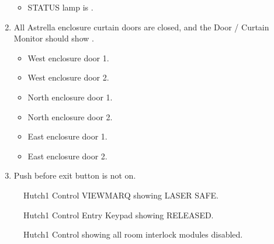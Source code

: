 \documentclass[letterpaper,10pt,english]{sphinxmanual}
\begin{document}
\begin{enumerate}
\begin{itemize}
\item {} 
\sphinxAtStartPar
STATUS lamp is .

\end{itemize}

\item {} 
\sphinxAtStartPar
All Astrella enclosure curtain doors are closed, and the Door / Curtain Monitor should show .
\begin{itemize}
\item {} 
\sphinxAtStartPar
West enclosure door 1.

\item {} 
\sphinxAtStartPar
West enclosure door 2.

\item {} 
\sphinxAtStartPar
North enclosure door 1.

\item {} 
\sphinxAtStartPar
North enclosure door 2.

\item {} 
\sphinxAtStartPar
East enclosure door 1.

\item {} 
\sphinxAtStartPar
East enclosure door 2.

\end{itemize}

\item {} 
\sphinxAtStartPar
Push before exit button is not on.

\end{enumerate}

\begin{figure}[htbp]
\centering
\capstart

\noindent{}
\caption{ Hutch\sphinxhyphen{}1 Control VIEWMARQ showing LASER SAFE.}\label{\detokenize{testing_documentation/Hutch-1_laser:id1}}\end{figure}

\begin{figure}[htbp]
\centering
\capstart

\noindent{}
\caption{ Hutch\sphinxhyphen{}1 Control Entry Keypad showing RELEASED.}\label{\detokenize{testing_documentation/Hutch-1_laser:id2}}\end{figure}

\begin{figure}[htbp]
\centering
\capstart

\noindent{}
\caption{ Hutch\sphinxhyphen{}1 Control showing all room interlock modules disabled.}\label{\detokenize{testing_documentation/Hutch-1_laser:id3}}\end{figure}
\end{document}
